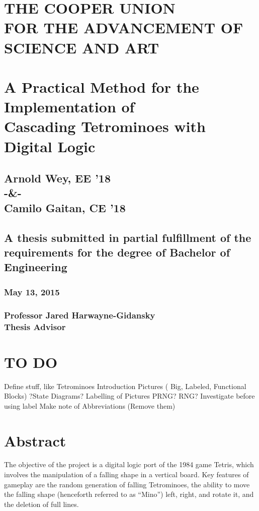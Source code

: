 \documentclass[letterpaper,titlepage,oneside]{article}
\begin{document}
\begin{center}
\section*{THE COOPER UNION \\FOR THE ADVANCEMENT OF SCIENCE AND ART\\[35pt]}
\section*{A Practical Method for the Implementation of \\Cascading Tetrominoes with Digital Logic\\[35pt]}
\subsection*{Arnold Wey, EE '18 \\[15pt]-\&-\\[15pt] Camilo Gaitan, CE '18\\[75pt]}
\subsection*{A thesis submitted in partial fulfillment of the requirements for the degree of Bachelor of Engineering\\[75pt]}
\subsubsection*{May 13, 2015\\[60pt]}
\subsubsection*{Professor Jared Harwayne-Gidansky\\[5pt]Thesis Advisor}
\end{center}
\clearpage
{}

\section{TO DO}
Define stuff, like Tetrominoes
Introduction
Pictures ( Big, Labeled, Functional Blocks)
?State Diagrams?
Labelling of Pictures
PRNG? RNG? Investigate before using label
Make note of Abbreviations (Remove them)


\section*{Abstract}
The objective of the project is a digital logic port of the 1984 game Tetris, which involves the manipulation of a falling shape in a vertical board. Key features of gameplay are the random generation of falling Tetrominoes, the ability to move the falling shape (henceforth referred to as ``Mino'') left, right, and rotate it, and the deletion of full lines. 
\end{document}
